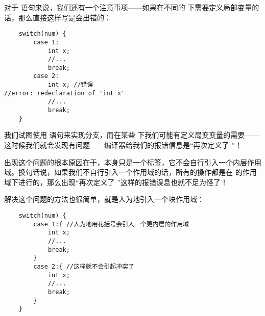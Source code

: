对于 \lstinline@switch@ 语句来说，我们还有一个注意事项——如果在不同的 \lstinline@case@ 下需要定义局部变量的话，那么直接这样写是会出错的：
\begin{lstlisting}
    switch(num) {
        case 1:
            int x;
            //...
            break;
        case 2:
            int x; //错误
//error: redeclaration of 'int x'
            //...
            break;
    }
\end{lstlisting}
我们试图使用 \lstinline@switch@ 语句来实现分支，而在某些 \lstinline@case@ 下我们可能有定义局变变量的需要——这时候我们就会发现有问题——编译器给我们的报错信息是``再次定义了 \lstinline@x@''！\par
出现这个问题的根本原因在于，\lstinline@case@ 本身只是一个标签，它不会自行引入一个内层作用域。换句话说，如果我们不自行引入一个作用域的话，所有的操作都是在 \lstinline@switch@ 的作用域下进行的，那么出现``再次定义了 \lstinline@x@''这样的报错误息也就不足为怪了！\par
解决这个问题的方法也很简单，就是人为地引入一个块作用域：
\begin{lstlisting}
    switch(num) {
        case 1:{ //人为地用花括号会引入一个更内层的作用域
            int x;
            //...
            break;
        }
        case 2:{ //这样就不会引起冲突了
            int x;
            //...
            break;
        }
    }
\end{lstlisting}\par
